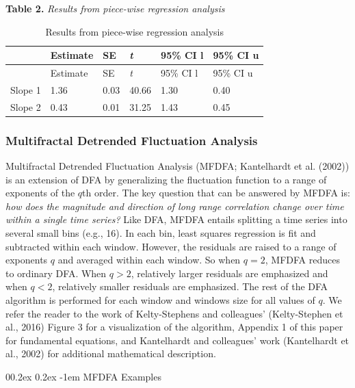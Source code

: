 \documentclass[
  man]{apa6}
\makeatletter
\let\oldparagraph\paragraph
\renewcommand{\paragraph}[1]{\oldparagraph{#1}\mbox{}}
\renewcommand{\paragraph}{\@startsection{paragraph}{4}{\parindent}%
  {0\baselineskip \@plus 0.2ex \@minus 0.2ex}%
  {-1em}%
  {\normalfont\normalsize\bfseries\itshape\typesectitle}}
\makeatother
\begin{document}
\textbf{Table 2.} \emph{Results from piece-wise regression analysis}

\begin{longtable}[]{@{}llllll@{}}
\caption{Results from piece-wise regression analysis}\tabularnewline
\toprule()
& Estimate & SE & \emph{t} & 95\% CI l & 95\% CI u \\
\midrule()
\endfirsthead
\toprule()
& Estimate & SE & \emph{t} & 95\% CI l & 95\% CI u \\
\midrule()
\endhead
Slope 1 & 1.36 & 0.03 & 40.66 & 1.30 & 0.40 \\
Slope 2 & 0.43 & 0.01 & 31.25 & 1.43 & 0.45 \\
\bottomrule()
\end{longtable}

\hypertarget{multifractal-detrended-fluctuation-analysis}{%
\subsubsection{Multifractal Detrended Fluctuation Analysis}\label{multifractal-detrended-fluctuation-analysis}}

Multifractal Detrended Fluctuation Analysis (MFDFA;
Kantelhardt et al. (2002)) is an extension of DFA
by generalizing the fluctuation function to a range of exponents of the
\(q\)th order. The key question that can be answered by MFDFA is: \emph{how
does the magnitude and direction of long range correlation change over
time within a single time series?} Like DFA, MFDFA entails splitting a
time series into several small bins (e.g., 16). In each bin, least
squares regression is fit and subtracted within each window. However,
the residuals are raised to a range of exponents \(q\) and averaged within
each window. So when \(q = 2\), MFDFA reduces to ordinary DFA. When
\(q >2\), relatively larger residuals are emphasized and when \(q < 2\),
relatively smaller residuals are emphasized. The rest of the DFA
algorithm is performed for each window and windows size for all values
of \(q\). We refer the reader to the work of Kelty-Stephens and
colleagues' (Kelty-Stephen et al., 2016) Figure
3 for a visualization of the algorithm, Appendix 1 of this paper for
fundamental equations, and Kantelhardt and colleagues' work
(Kantelhardt et al., 2002) for additional
mathematical description.

\hypertarget{mfdfa-examples}{%
\paragraph{MFDFA Examples}\label{mfdfa-examples}}
\end{document}
